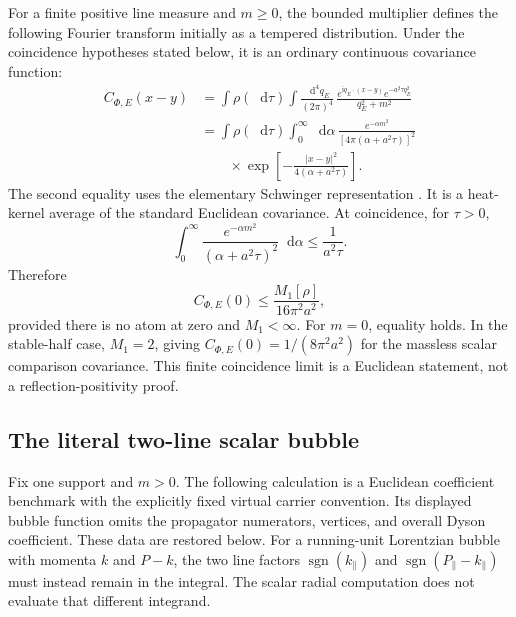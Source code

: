 \documentclass[final,5p,times,twocolumn,numbers,nopreprintline]{elsarticle}
\numberwithin{equation}{section}
\theoremstyle{definition}
\theoremstyle{remark}
\newcommand{\dd}{\mathop{}\!\mathrm d}
\newcommand{\ii}{\mathrm i}
\newcommand{\Ph}{\Phi}
\newcommand{\sgn}{\operatorname{sgn}}
\begin{document}
For a finite positive line measure and \(m\geq0\), the bounded
multiplier defines the following Fourier transform initially as a
tempered distribution. Under the coincidence hypotheses stated below,
it is an ordinary continuous covariance function:
\begin{align}
 C_{\Ph,E}(x-y)
 &=\int\rho(\dd\tau)
     \int\frac{\dd^4q_E}{(2\pi)^4}\,
       \frac{e^{\ii q_E\cdot(x-y)}
                 e^{-a^2\tau q_E^2}}{q_E^2+m^2}
 \label{eq:coordinate-covariance}\\
 &=\int\rho(\dd\tau)\int_0^\infty\dd\alpha\,
     \frac{e^{-\alpha m^2}}
          {[4\pi(\alpha+a^2\tau)]^2}\nonumber\\
 &\qquad\times\exp\!\left[-\frac{|x-y|^2}
                         {4(\alpha+a^2\tau)}\right].
 \label{eq:coordinate-heat-form}
\end{align}
The second equality uses the elementary Schwinger representation
\cite{Schwinger1951}. It is a heat-kernel average of the standard
Euclidean covariance. At coincidence, for \(\tau>0\),
\[
 \int_0^\infty
 \frac{e^{-\alpha m^2}}{(\alpha+a^2\tau)^2}\dd\alpha
       \leq\frac1{a^2\tau}.
\]
Therefore
\begin{equation}
 C_{\Ph,E}(0)\leq
       \frac{M_1[\rho]}{16\pi^2a^2},
 \label{eq:coincidence-bound}
\end{equation}
provided there is no atom at zero and \(M_1<\infty\).
For \(m=0\), equality holds. In the stable-half case,
\(M_1=2\), giving
\(C_{\Ph,E}(0)=1/(8\pi^2a^2)\) for the massless scalar
comparison covariance. This finite coincidence limit is a
Euclidean statement, not a reflection-positivity proof.

\subsection{The literal two-line scalar bubble}
\label{sec:literal-bubble}

Fix one support and \(m>0\). The following calculation is a
Euclidean coefficient benchmark with the explicitly fixed virtual
carrier convention. Its displayed bubble function omits the
propagator numerators, vertices, and overall Dyson coefficient.
These data are restored below. For a running-unit Lorentzian
bubble with momenta \(k\) and \(P-k\), the two line factors
\(\sgn(k_\parallel)\) and
\(\sgn(P_\parallel-k_\parallel)\) must instead remain in the
integral. The scalar radial computation does not evaluate that
different integrand.
\end{document}
